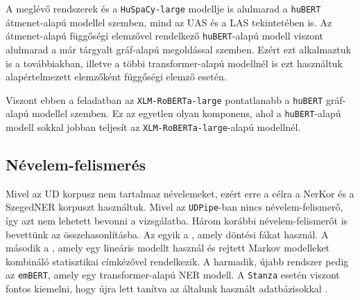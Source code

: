 \documentclass{llncs}
\newcommand{\embert}{\texttt{emBERT}}
\newcommand{\hubert}{\texttt{huBERT}}
\newcommand{\huspacyl}{\texttt{HuSpaCy-large}}
\newcommand{\robertaL}{\texttt{XLM-RoBERTa-large}}
\newcommand{\udpipe}{\texttt{UDPipe}}
\newcommand{\stanza}{\texttt{Stanza}}
\newcommand{\trf}{transformer}
\begin{document}
A meglévő rendszerek és a \huspacyl{} modellje is alulmarad a \hubert{} átmenet-alapú modellel szemben, mind az UAS és a LAS tekintetében is. Az átmenet-alapú függőségi elemzővel rendelkező \hubert{}-alapú modell viszont alulmarad a már tárgyalt gráf-alapú megoldással szemben. Ezért ezt alkalmaztuk is a továbbiakban, illetve a többi \trf{}-alapú modellnél is ezt használtuk alapértelmezett elemzőként függőségi elemző esetén.

Viszont ebben a feladatban az \robertaL{} pontatlanabb a \hubert{} gráf-alapú modellel szemben. Ez az egyetlen olyan komponens, ahol a \hubert{}-alapú modell sokkal jobban teljesít az \robertaL{}-alapú modellnél.

\subsection{Névelem-felismerés}

Mivel az UD korpusz nem tartalmaz névelemeket, ezért erre a célra a NerKor \citep{nerkor} és a SzegedNER \citep{szegedner} korpuszt használtuk. Mivel az \udpipe{}-ban nincs névelem-felismerő, így azt nem lehetett bevonni a vizsgálatba. Három korábbi névelem-felismerőt is bevettünk az összehasonlításba. Az egyik a \cite{szarvas-ner}, amely döntési fákat használ. A második a \cite{simon-ner}, amely egy lineáris modellt használ és rejtett Markov modelleket kombináló statisztikai címkézővel rendelkezik. A harmadik, újabb rendszer pedig az \embert{}, amely egy \trf{}-alapú NER modell. A \stanza{} esetén viszont fontos kiemelni, hogy újra lett tanítva az általunk használt adatbázisokkal \citep{nerkoreval}. 
\end{document}
